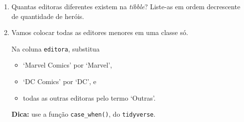 \documentclass[
  11pt]{report}
\providecommand{\tightlist}{%
  \setlength{\itemsep}{0pt}\setlength{\parskip}{0pt}}
\begin{document}
\begin{enumerate}

\item
  Quantas editoras diferentes existem na \emph{tibble}? Liste-as em ordem decrescente de quantidade de heróis.

\item
  Vamos colocar todas as editores menores em uma classe só.

  Na coluna \texttt{editora}, substitua

  \begin{itemize}
  \tightlist
  \item
    `Marvel Comics' por `Marvel',
  \item
    `DC Comics' por `DC', e
  \item
    todas as outras editoras pelo termo `Outras'.
  \end{itemize}

  \textbf{Dica:} use a função \texttt{case\_when()}, do \texttt{tidyverse}.

\end{enumerate}
\end{document}

